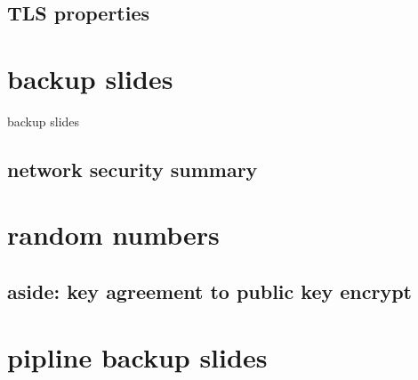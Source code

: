 \subsection{TLS properties}




\usetikzlibrary{circuits.logic.mux}







\section{backup slides}
\begin{frame}{backup slides}
\end{frame}
\subsection{network security summary}


\section{random numbers}

\subsection{aside: key agreement to public key encrypt}

\section{pipline backup slides}



